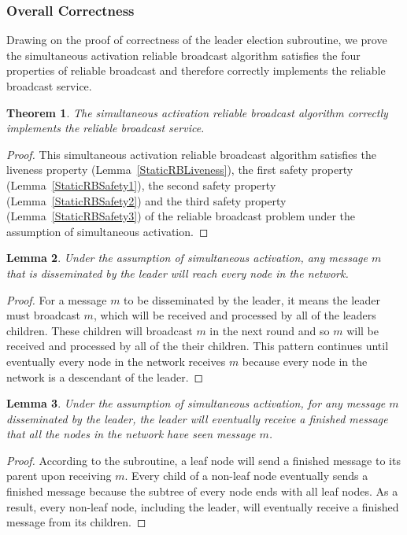 \documentclass[english]{article}
\newtheorem{theorem}{Theorem}[section]
\newtheorem{lemma}[theorem]{Lemma}
\begin{document}
\subsubsection {Overall Correctness}

Drawing on the proof of correctness of the leader election subroutine, we prove the simultaneous activation reliable broadcast algorithm satisfies the four properties of reliable broadcast and therefore correctly implements the reliable broadcast service.

\begin{theorem}
\label{StaticReliableBroadcast}
The simultaneous activation reliable broadcast algorithm correctly implements the reliable broadcast service.
\end{theorem}
\begin{proof}
This simultaneous activation reliable broadcast algorithm satisfies the liveness property (Lemma~\ref{StaticRBLiveness}), 
the first safety property (Lemma~\ref{StaticRBSafety1}),
the second safety property (Lemma~\ref{StaticRBSafety2}) and 
the third safety property (Lemma~\ref{StaticRBSafety3}) of the reliable broadcast problem under the assumption of simultaneous activation.
\end{proof}

\begin{lemma}
\label{StaticMessageDissemination}
Under the assumption of simultaneous activation, any message $m$ that is disseminated by the leader will reach every node in the network.
\end{lemma}
\begin{proof}

For a message $m$ to be disseminated by the leader, it means the leader must broadcast $m$, which will be received and processed by all of the leaders children. These children will broadcast $m$ in the next round and so $m$ will be received and processed by all of the their children. This pattern continues until eventually every node in the network receives $m$ because every node in the network is a descendant of the leader. 

\end{proof}


\begin{lemma}
\label{StaticConfirmationMessage}
Under the assumption of simultaneous activation, for any message $m$ disseminated by the leader, the leader will eventually receive a finished message that all the nodes in the network have seen message $m$.
\end{lemma}
\begin{proof}

According to the subroutine, a leaf node will send a finished message to its parent upon receiving $m$. Every child of a non-leaf node eventually sends a finished message because the subtree of every node ends with all leaf nodes. As a result, every non-leaf node, including the leader, will eventually receive a finished message from its children.

\end{proof}
\end{document}
